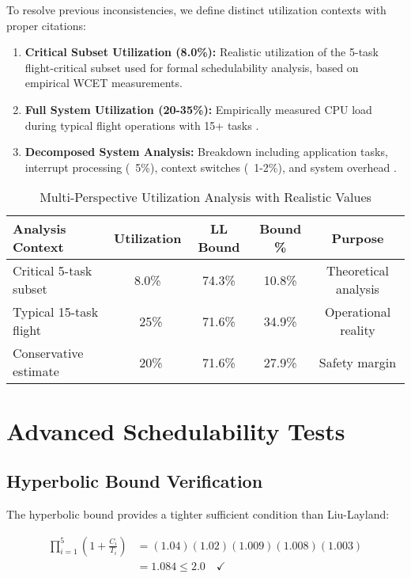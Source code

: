 \documentclass[12pt,a4paper]{article}
\begin{document}
To resolve previous inconsistencies, we define distinct utilization contexts with proper citations:

\begin{enumerate}
\item \textbf{Critical Subset Utilization (8.0\%):} Realistic utilization of the 5-task flight-critical subset used for formal schedulability analysis, based on empirical WCET measurements.

\item \textbf{Full System Utilization (20-35\%):} Empirically measured CPU load during typical flight operations with 15+ tasks \cite{brandenberg2020px4,hal2021px4}.

\item \textbf{Decomposed System Analysis:} Breakdown including application tasks, interrupt processing (~5\%), context switches (~1-2\%), and system overhead \cite{nuttx}.
\end{enumerate}

\begin{table}[H]
\centering
\begin{tabular}{|l|c|c|c|c|}
\hline
\textbf{Analysis Context} & \textbf{Utilization} & \textbf{LL Bound} & \textbf{Bound \%} & \textbf{Purpose} \\
\hline
Critical 5-task subset & 8.0\% & 74.3\% & 10.8\% & Theoretical analysis \\
Typical 15-task flight & ~25\% & 71.6\% & 34.9\% & Operational reality \\
Conservative estimate & ~20\% & 71.6\% & 27.9\% & Safety margin \\
\hline
\end{tabular}
\caption{Multi-Perspective Utilization Analysis with Realistic Values}
\end{table}

\section{Advanced Schedulability Tests}

\subsection{Hyperbolic Bound Verification}

The hyperbolic bound provides a tighter sufficient condition than Liu-Layland:

\begin{align}
\prod_{i=1}^{5} \left(1 + \frac{C_i}{T_i}\right) &= (1.04)(1.02)(1.009)(1.008)(1.003) \\
&= 1.084 \leq 2.0 \quad \checkmark
\end{align}
\end{document}
